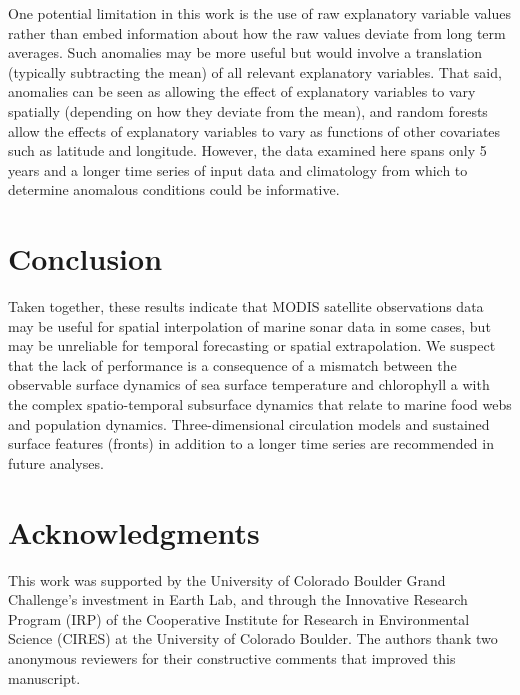 \documentclass[10pt,letterpaper]{article}
\begin{document}
One potential limitation in this work is the use of raw explanatory variable values rather than embed information about how the raw values deviate from long term averages. 
Such anomalies may be more useful but would involve a translation (typically subtracting the mean) of all relevant explanatory variables.
That said, anomalies can be seen as allowing the effect of explanatory variables to vary spatially (depending on how they deviate from the mean), and random forests allow the effects of explanatory variables to vary as functions of other covariates such as latitude and longitude. However, the data examined here spans only 5 years and a longer time series of input data and climatology from which to determine anomalous conditions could be informative. 

\section*{Conclusion}

Taken together, these results indicate that MODIS satellite observations data may be useful for spatial interpolation of marine sonar data in some cases, but may be unreliable for temporal forecasting or spatial extrapolation. We suspect that the lack of performance is a consequence of a mismatch between the observable surface dynamics of sea surface temperature and chlorophyll a with the complex spatio-temporal subsurface dynamics that relate to marine food webs and population dynamics. Three-dimensional circulation models and sustained surface features (fronts) in addition to a longer time series are recommended in future analyses.

\section*{Acknowledgments}
This work was supported by the University of Colorado Boulder Grand Challenge's investment in Earth Lab, and through the Innovative Research Program (IRP) of the Cooperative Institute for Research in Environmental Science (CIRES) at the University of Colorado Boulder. The authors thank two anonymous reviewers for their constructive comments that improved this manuscript.

\nolinenumbers

%
%
% 

\end{document}
